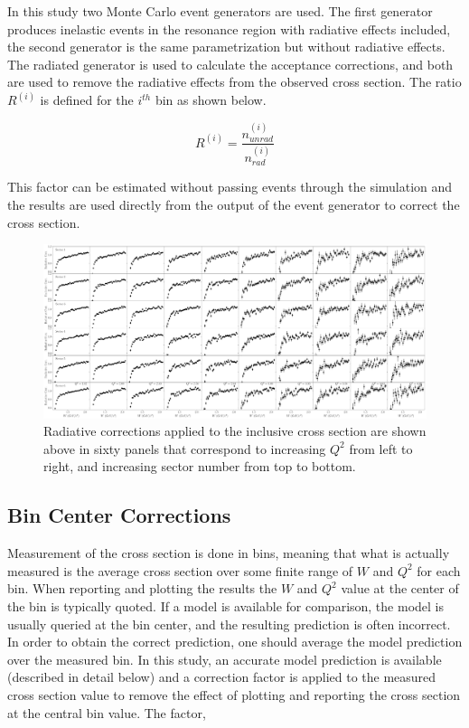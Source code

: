 In this study two Monte Carlo event generators are used.  The first generator produces inelastic events in the resonance region with radiative effects included, the second generator is the same parametrization but without radiative effects.  The radiated generator is used to calculate the acceptance corrections, and both are used to remove the radiative effects from the observed cross section.  The ratio $R^{(i)}$ is defined for the $i^{th}$ bin as shown below. 

\begin{equation}
  R^{(i)} = \frac{n_{unrad}^{(i)}}{n_{rad}^{(i)}}
\end{equation}

This factor can be estimated without passing events through the simulation and the results are used directly from the output of the event generator to correct the cross section.  

\begin{figure}
	\centering
	\label{fig-rad-corr-grid} 
	\includegraphics[width=\textwidth]{image/plots/inclusive/rad_corr_grid.pdf}
	\caption{Radiative corrections applied to the inclusive cross section are shown above in sixty panels that correspond to increasing $Q^2$ from left to right, and increasing sector number from top to bottom.  }
\end{figure}

\subsection{Bin Center Corrections}
Measurement of the cross section is done in bins, meaning that what is actually measured is the average cross section over some finite range of $W$ and $Q^2$ for each bin.  When reporting and plotting the results the $W$ and $Q^2$ value at the center of the bin is typically quoted.  If a model is available for comparison, the model is usually queried at the bin center, and the resulting prediction is often incorrect.  In order to obtain the correct prediction, one should average the model prediction over the measured bin.  In this study, an accurate model prediction is available (described in detail below) and a correction factor is applied to the measured cross section value to remove the effect of plotting and reporting the cross section at the central bin value.  The factor, 

